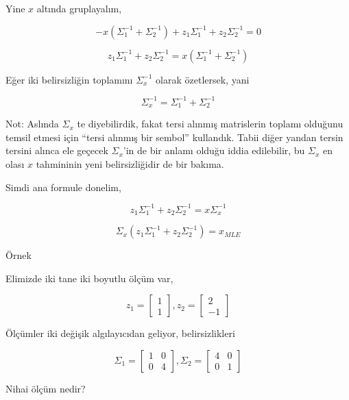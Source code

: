 \documentclass[12pt,fleqn]{article}\usepackage{../../common}
\begin{document}
Yine $x$ altında gruplayalım,

$$ 
-x(\Sigma_1^{-1} + \Sigma_2^{-1}) + z_1\Sigma_1^{-1}  + z_2\Sigma_2^{-1}  = 0
$$

$$ 
z_1\Sigma_1^{-1}  + z_2\Sigma_2^{-1}  = x(\Sigma_1^{-1} + \Sigma_2^{-1}) 
$$

Eğer iki belirsizliğin toplamını $\Sigma_x^{-1}$ olarak özetlersek, yani 

$$ 
\Sigma_x^{-1} = \Sigma_1^{-1} + \Sigma_2^{-1}
$$

Not: Aslında $\Sigma_x$ te diyebilirdik, fakat tersi alınmış matrislerin
toplamı olduğunu temsil etmesi için ``tersi alınmış bir sembol''
kullandık. Tabii diğer yandan tersin tersini alınca ele geçecek
$\Sigma_x$'in de bir anlamı olduğu iddia edilebilir, bu $\Sigma_x$ en olası
$x$ tahmininin yeni belirsizliğidir de bir bakıma. 

Simdi ana formule donelim,

$$ 
z_1\Sigma_1^{-1}  + z_2\Sigma_2^{-1}  = x\Sigma_x^{-1}
$$


$$ 
\Sigma_x (z_1\Sigma_1^{-1}  + z_2\Sigma_2^{-1}) = x_{MLE}
$$

Örnek

Elimizde iki tane iki boyutlu ölçüm var, 

$$ z_1 = \left[\begin{array}{c}
1 \\ 1
\end{array}\right], 
z_2 = \left[\begin{array}{r}
2 \\ -1
\end{array}\right] 
$$

Ölçümler iki değişik algılayıcıdan geliyor, belirsizlikleri

$$ 
\Sigma_1 = 
\left[\begin{array}{cc}
1 & 0 \\ 0 & 4
\end{array}\right], 
\Sigma_2 = 
\left[\begin{array}{cc}
4 & 0 \\ 0 & 1
\end{array}\right]
 $$

Nihai ölçüm nedir? 
\end{document}
